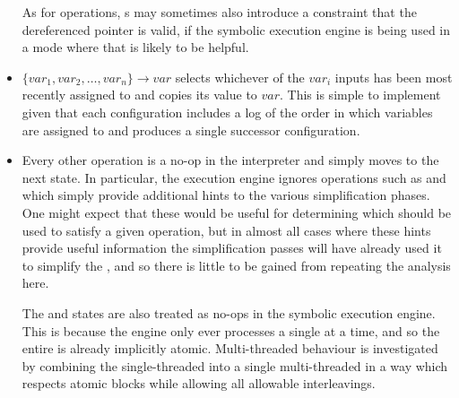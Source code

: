 \begin{itemize}
  As for  operations, s may sometimes also
  introduce a constraint that the dereferenced pointer is valid, if
  the symbolic execution engine is being used in a mode where that is
  likely to be helpful.

\item \state{$\Phi$} $\{var_1,var_2,\ldots{},var_n\} \rightarrow var$
  selects whichever of the $var_i$ inputs has been most recently
  assigned to and copies its value to $var$.  This is simple to
  implement given that each configuration includes a log of the order
  in which variables are assigned to and produces a single successor
  configuration.

\item
  Every other operation is a no-op in the interpreter and simply moves
  to the next state.  In particular, the execution engine ignores
  operations such as  and  which
  simply provide additional hints to the various \StateMachine
  simplification phases.  One might expect that these would be useful
  for determining which  should be used to satisfy a
  given  operation, but in almost all cases where these
  hints provide useful information the {\StateMachine} simplification
  passes will have already used it to simplify the {\StateMachine},
  and so there is little to be gained from repeating the analysis
  here.

  The  and  states are also
  treated as no-ops in the symbolic execution engine.  This is because
  the engine only ever processes a single {\StateMachine} at a time,
  and so the entire {\StateMachine} is already implicitly atomic.
  Multi-threaded behaviour is investigated by combining the
  single-threaded {\StateMachines} into a single multi-threaded
  {\StateMachine} in a way which respects atomic blocks while allowing
  all allowable interleavings.

\end{itemize}



